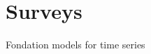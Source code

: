 \section{Surveys}

Fondation models for time series

\cite{ye2024survey} 

\cite{liang2024foundation} 